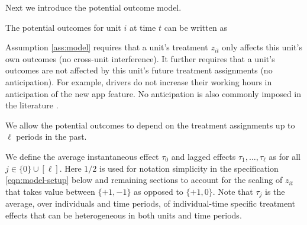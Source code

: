 Next we introduce the potential outcome model. 

\begin{assumption}\label{ass:model}
The potential outcomes for unit $i$ at time $t$ can be written as

\end{assumption}


Assumption \ref{ass:model} requires that a unit's treatment $z_{it}$ only affects this unit's own outcomes (no cross-unit interference). It further requires that a unit's outcomes are not affected by this unit's future treatment assignments (no anticipation). For example, drivers do not increase their working hours in anticipation of the new app feature. No anticipation is also commonly imposed in the literature \citep{basse2019minimax,bojinov2020design}. 

We allow the potential outcomes to depend on the treatment assignments up to $\ell$ periods in the past. 


We define the average instantaneous effect $\tau_0$ and lagged effects $\tau_1,\dots,\tau_\ell$ as 
 for all $j\in \{0\} \cup [\ell]$. 
 Here $1/2$ is used for notation simplicity in the specification \eqref{eqn:model-setup} below and remaining sections to account for the scaling of $z_{it}$ that takes value between $\{+1,-1\}$ as opposed to $\{+1,0\}$. Note that $\tau_j$ is the average, over individuals and time periods, of individual-time specific treatment effects that can be heterogeneous in both units and time periods.



